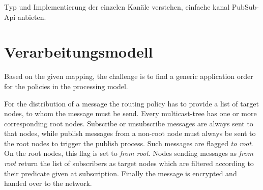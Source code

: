 \begin{table}[!h]
\caption{Verbindungsmatrix}
\label{tab:verbindungsmatrix}
\end{table}


\cite{Fischer2010a, Fischer2010Event}

\cite{BeFiMu2006PubSubQoS}




Typ und Implementierung der einzelen Kanäle verstehen, einfache kanal PubSub-Api anbieten.


\section{Verarbeitungsmodell}

Based on the given mapping, the challenge is to find a generic application order for the policies in the processing model.

For the distribution of a message the routing policy has to provide a list of target nodes, to whom the message must be send. Every multicast-tree has one or more corresponding root nodes. Subscribe or unsubscribe messages are always sent to that nodes, while publish messages from a non-root node must always be sent to the root nodes to trigger the publish process. Such messages are flagged \emph{to root}. On the root nodes, this flag is set to \emph{from root}. Nodes sending messages as \emph{from root} return the list of subscribers as target nodes which are filtered according to their predicate given at subscription. Finally the message is encrypted and handed over to the network.



